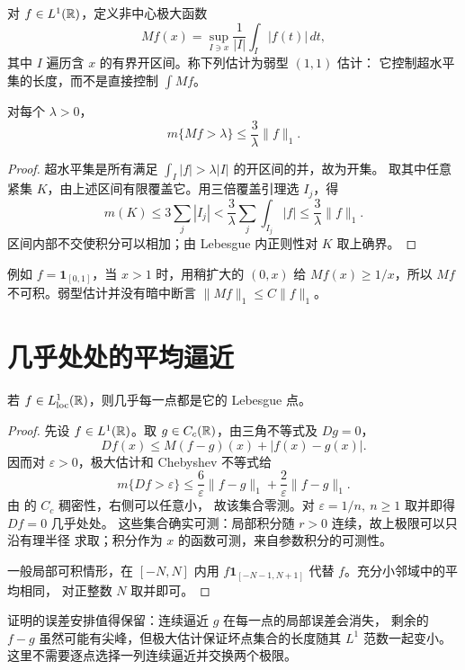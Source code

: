 对 \(f\in L^1(\mathbb{R})\)，定义非中心极大函数
\[
 Mf(x)=\sup_{I\ni x}\frac1{|I|}\int_I|f(t)|\,dt,
\]
其中 \(I\) 遍历含 \(x\) 的有界开区间。称下列估计为弱型 \((1,1)\) 估计：
它控制超水平集的长度，而不是直接控制 \(\int Mf\)。

\begin{theorem}\label{thm:maximal-weak-line}
对每个 \(\lambda>0\)，
\[
 m\{Mf>\lambda\}\le\frac3\lambda\|f\|_1.
\]
\end{theorem}
\begin{proof}
超水平集是所有满足 \(\int_I|f|>\lambda|I|\) 的开区间的并，故为开集。
取其中任意紧集 \(K\)，由上述区间有限覆盖它。用三倍覆盖引理选 \(I_j\)，得
\[
 m(K)\le3\sum_j|I_j|
 <\frac3\lambda\sum_j\int_{I_j}|f|
 \le\frac3\lambda\|f\|_1.
\]
区间内部不交使积分可以相加；由 Lebesgue 内正则性对 \(K\) 取上确界。
\end{proof}

例如 \(f=\mathbf1_{[0,1]}\)，当 \(x>1\) 时，用稍扩大的 \((0,x)\) 给
\(Mf(x)\ge1/x\)，所以 \(Mf\) 不可积。弱型估计并没有暗中断言
\(\|Mf\|_1\le C\|f\|_1\)。

\section{几乎处处的平均逼近}

\begin{theorem}\label{thm:lebesgue-differentiation-line}
若 \(f\in L^1_{\mathrm{loc}}(\mathbb{R})\)，则几乎每一点都是它的 Lebesgue 点。
\end{theorem}
\begin{proof}
先设 \(f\in L^1(\mathbb{R})\)。取 \(g\in C_c(\mathbb{R})\)，由三角不等式及 \(Dg=0\)，
\[
 Df(x)\le M(f-g)(x)+|f(x)-g(x)|.
\]
因而对 \(\varepsilon>0\)，极大估计和 Chebyshev 不等式给
\[
 m\{Df>\varepsilon\}
 \le\frac6\varepsilon\|f-g\|_1+\frac2\varepsilon\|f-g\|_1.
\]
由 的 \(C_c\) 稠密性，右侧可以任意小，
故该集合零测。对 \(\varepsilon=1/n,\ n\ge1\) 取并即得 \(Df=0\) 几乎处处。
这些集合确实可测：局部积分随 \(r>0\) 连续，故上极限可以只沿有理半径
求取；积分作为 \(x\) 的函数可测，来自参数积分的可测性。

一般局部可积情形，在 \([-N,N]\) 内用
\(f\mathbf1_{[-N-1,N+1]}\) 代替 \(f\)。充分小邻域中的平均相同，
对正整数 \(N\) 取并即可。
\end{proof}

证明的误差安排值得保留：连续逼近 \(g\) 在每一点的局部误差会消失，
剩余的 \(f-g\) 虽然可能有尖峰，但极大估计保证坏点集合的长度随其
\(L^1\) 范数一起变小。这里不需要逐点选择一列连续逼近并交换两个极限。

